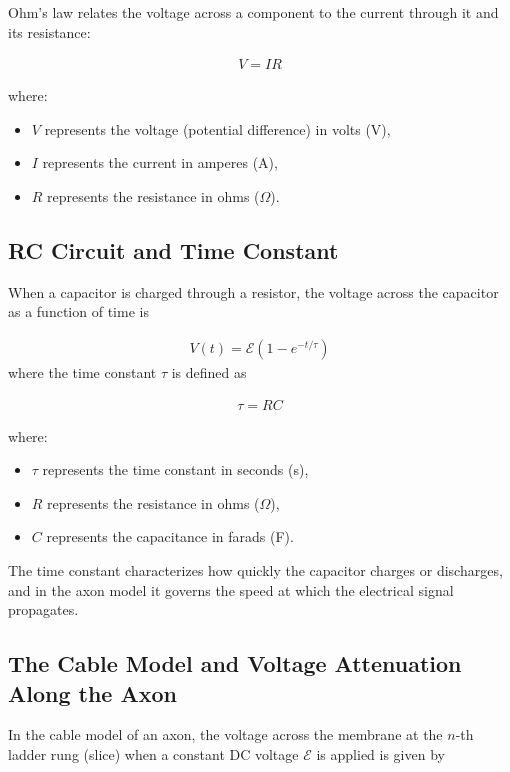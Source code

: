 \message{ !name(lab_report.tex)}\documentclass[12pt]{article}
\begin{document}
Ohm's law relates the voltage across a component to the current through it and its resistance:

\begin{align*}
    V = IR
\end{align*}

where:
\begin{itemize}
    \item $V$ represents the voltage (potential difference) in volts (V),
    \item $I$ represents the current in amperes (A),
    \item $R$ represents the resistance in ohms ($\Omega$).
\end{itemize}

\subsection{RC Circuit and Time Constant}

When a capacitor is charged through a resistor, the voltage across the capacitor as a function of time is

\begin{align*}
    V(t) = \mathcal{E}\left(1 - e^{-t/\tau}\right)
\end{align*}
where the time constant $\tau$ is defined as

\begin{align*}
    \tau = RC
\end{align*}

where:
\begin{itemize}
    \item $\tau$ represents the time constant in seconds (s),
    \item $R$ represents the resistance in ohms ($\Omega$),
    \item $C$ represents the capacitance in farads (F).
\end{itemize}

The time constant characterizes how quickly the capacitor charges or discharges, and in the axon model it governs the speed at which the electrical signal propagates.

\subsection{The Cable Model and Voltage Attenuation Along the Axon}

In the cable model of an axon, the voltage across the membrane at the $n$-th ladder rung (slice) when a constant DC voltage $\mathcal{E}$ is applied is given by
\end{document}
